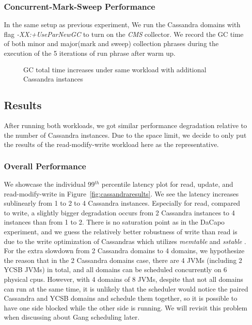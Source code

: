 \documentclass{sig-alternate}
\begin{document}
\subsubsection{Concurrent-Mark-Sweep Performance}
In the same setup as previous experiment, We run the Cassandra domains with flag \textit{-XX:+UseParNewGC} to turn on the \textit{CMS} collector. We record the GC time of both minor and major(mark and sweep) collection phrases during the execution of the 5 iterations of run phrase after warm up.

\begin{figure}
\centering
{}
\caption{GC total time increases under same workload with additional Cassandra instances}
\label{fig:cassandragc}
\end{figure}

\subsection{Results}
After running both workloads, we got similar performance degradation relative to the number of Cassandra instances. Due to the space limit, we decide to only put the results of the read-modify-write workload here as the representative.

\subsubsection{Overall Performance}
We showcase the individual 99$^{th}$ percentile latency plot for read, update, and read-modify-write in Figure~\ref{fig:cassandraresults}. We see the latency increases sublinearly from 1 to 2 to 4 Cassandra instances. Especially for read, compared to write, a slightly bigger degradation occurs from 2 Cassandra instances to 4 instances than from 1 to 2. There is no saturation point as in the DaCapo experiment, and we guess the relatively better robustness of write than read is due to the write optimization of Cassandras which utilizes \textit{memtable} and \textit{sstable} \cite{lakshman2010cassandra}. For the extra slowdown from 2 Cassandra domains to 4 domains, we hypothesize the reason that in the 2 Cassandra domains case, there are 4 JVMs (including 2 YCSB JVMs) in total, and all domains can be scheduled concurrently on 6 physical cpus. However, with 4 domains of 8 JVMs, despite that not all domains can run at the same time, it is unlikely that the scheduler would notice the paired Cassandra and YCSB domains and schedule them together, so it is possible to have one side blocked while the other side is running. We will revisit this problem when discussing about Gang scheduling later.
\end{document}
